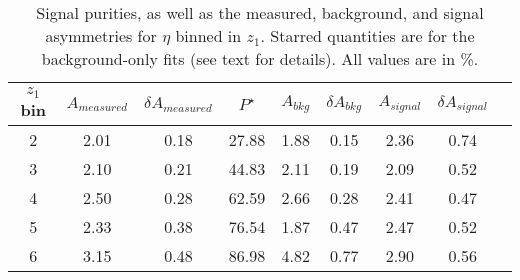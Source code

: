 
\begin{table}[H]\footnotesize
\centering
\begin{tabular}{|c|c|c|c|c|c|c|c|c|}
 \hline
$z_1$ bin & $A_{measured}$ & $\delta A_{measured}$ & $P^{\star}$  & $A_{bkg}$ & $\delta A_{bkg}$ & $A_{signal}$ & $\delta A_{signal}$ \\ \hline \hline
2 & 2.01 & 0.18 & 27.88 & 1.88 & 0.15 & 2.36  & 0.74 \\ \hline 
3 & 2.10 & 0.21 & 44.83 & 2.11 & 0.19 & 2.09  & 0.52 \\ \hline 
4 & 2.50 & 0.28 & 62.59 & 2.66 & 0.28 & 2.41  & 0.47 \\ \hline 
5 & 2.33 & 0.38 & 76.54 & 1.87 & 0.47 & 2.47  & 0.52 \\ \hline 
6 & 3.15 & 0.48 & 86.98 & 4.82 & 0.77 & 2.90  & 0.56 \\ \hline 
\end{tabular}
\caption[BG-correction quantities for $\eta$ asymmetries, $z_{1}$ bins]{Signal purities, as well as the measured, background, and signal asymmetries for $\eta$ binned in $z_{1}$. Starred quantities are for the background-only fits (see text for details). All values are in \%.}
\label{tab:etasinzbkgcor}
\end{table}

